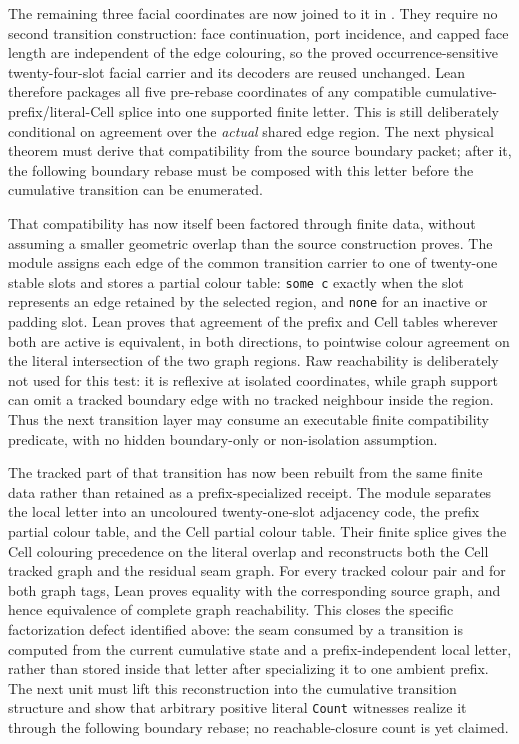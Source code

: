 \documentclass[11pt]{article}
\theoremstyle{definition}
\begin{document}
The remaining three facial coordinates are now joined to it in
.
They require no second transition construction: face continuation, port
incidence, and capped face length are independent of the edge colouring, so
the proved occurrence-sensitive twenty-four-slot facial carrier and its
decoders are reused unchanged.  Lean therefore packages all five pre-rebase
coordinates of any compatible cumulative-prefix/literal-Cell splice into one
supported finite letter.  This is still deliberately conditional on agreement
over the \emph{actual} shared edge region.  The next physical theorem must
derive that compatibility from the source boundary packet; after it, the
following boundary rebase must be composed with this letter before the
cumulative transition can be enumerated.

That compatibility has now itself been factored through finite data, without
assuming a smaller geometric overlap than the source construction proves.
The module
assigns each edge of the common transition carrier to one of twenty-one stable
slots and stores a partial colour table: \texttt{some c} exactly when the slot
represents an edge retained by the selected region, and \texttt{none} for an
inactive or padding slot.  Lean proves that agreement of the prefix and Cell
tables wherever both are active is equivalent, in both directions, to
pointwise colour agreement on the literal intersection of the two graph
regions.  Raw reachability is deliberately not used for this test: it is
reflexive at isolated coordinates, while graph support can omit a tracked
boundary edge with no tracked neighbour inside the region.  Thus the next
transition layer may consume an executable finite compatibility predicate,
with no hidden boundary-only or non-isolation assumption.

The tracked part of that transition has now been rebuilt from the same finite
data rather than retained as a prefix-specialized receipt.  The module
separates the local letter into an uncoloured twenty-one-slot adjacency code,
the prefix partial colour table, and the Cell partial colour table.  Their
finite splice gives the Cell colouring precedence on the literal overlap and
reconstructs both the Cell tracked graph and the residual seam graph.  For
every tracked colour pair and for both graph tags, Lean proves equality with
the corresponding source graph, and hence equivalence of complete graph
reachability.  This closes the specific factorization defect identified above:
the seam consumed by a transition is computed from the current cumulative
state and a prefix-independent local letter, rather than stored inside that
letter after specializing it to one ambient prefix.  The next unit must lift
this reconstruction into the cumulative transition structure and show that
arbitrary positive literal \texttt{Count} witnesses realize it through the
following boundary rebase; no reachable-closure count is yet claimed.
\end{document}
